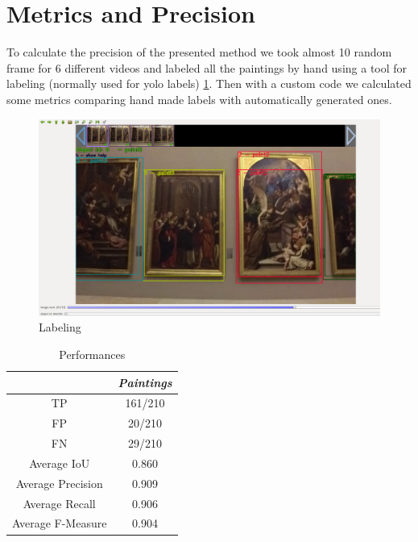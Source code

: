 \documentclass[conference]{IEEEtran}
\begin{document}
\section{Metrics and Precision}
To calculate the precision of the presented method we took almost 10 random frame for 6 different videos and labeled all the paintings by hand using a tool for labeling (normally used for yolo labels) \ref{fig_labeling}. Then with a custom code we calculated some metrics comparing hand made labels with automatically generated ones.

\begin{figure}[htbp]
\centerline{\includegraphics[width=0.8\columnwidth]{../Labeling_precision_metrics/Precision_Labeling.png}}
\caption{Labeling}
\label{fig_labeling}
\end{figure}

\begin{table}[htbp]
\caption{Performances}
\begin{center}
\begin{tabular}{|c|c|}
\hline
\textbf{} & \textbf{\textit{Paintings}} \\
\hline
TP& 161/210\\
\hline
FP& 20/210\\
\hline
FN& 29/210\\
\hline
Average IoU& 0.860\\
\hline
Average Precision& 0.909\\
\hline
Average Recall& 0.906\\
\hline
Average F-Measure& 0.904\\
\hline
\end{tabular}
\label{tab1}
\end{center}
\end{table}
\end{document}
